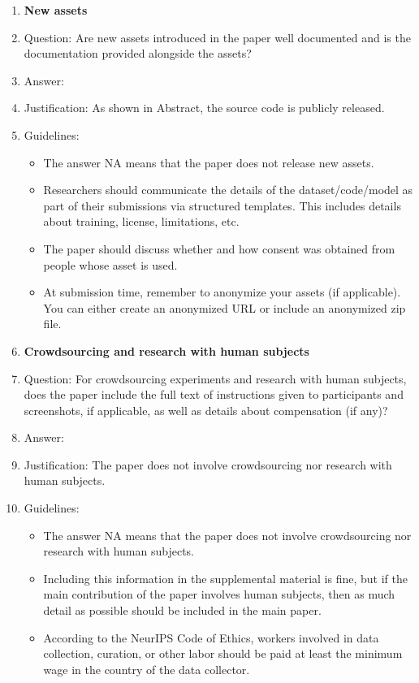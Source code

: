 \documentclass{article}
\begin{document}
\begin{enumerate}
\item {\bf New assets}
    \item[] Question: Are new assets introduced in the paper well documented and is the documentation provided alongside the assets?
    \item[] Answer: \answerYes{} %
    \item[] Justification: As shown in Abstract, the source code is publicly released.
    \item[] Guidelines:
    \begin{itemize}
        \item The answer NA means that the paper does not release new assets.
        \item Researchers should communicate the details of the dataset/code/model as part of their submissions via structured templates. This includes details about training, license, limitations, etc. 
        \item The paper should discuss whether and how consent was obtained from people whose asset is used.
        \item At submission time, remember to anonymize your assets (if applicable). You can either create an anonymized URL or include an anonymized zip file.
    \end{itemize}

\item {\bf Crowdsourcing and research with human subjects}
    \item[] Question: For crowdsourcing experiments and research with human subjects, does the paper include the full text of instructions given to participants and screenshots, if applicable, as well as details about compensation (if any)? 
    \item[] Answer: \answerNA{} %
    \item[] Justification: The paper does not involve crowdsourcing nor research with human subjects.
    \item[] Guidelines:
    \begin{itemize}
        \item The answer NA means that the paper does not involve crowdsourcing nor research with human subjects.
        \item Including this information in the supplemental material is fine, but if the main contribution of the paper involves human subjects, then as much detail as possible should be included in the main paper. 
        \item According to the NeurIPS Code of Ethics, workers involved in data collection, curation, or other labor should be paid at least the minimum wage in the country of the data collector. 
    \end{itemize}


\end{enumerate}
\end{document}
